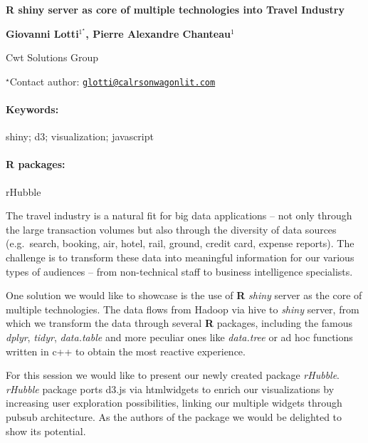 \documentclass[11pt, a4paper]{article}
\renewcommand{\title}[1]{\begin{center}{\bf \LARGE #1}\end{center}}
\newcommand{\keywords}{\paragraph{Keywords:}}
\newcommand{\packages}{\paragraph{R packages:}}
\begin{document}
\pagestyle{empty}

\title{R shiny server as core of multiple technologies into Travel Industry}

\begin{center}
  {\bf {} Giovanni Lotti$^{1^\star}$,  Pierre Alexandre Chanteau$^{1}$}
\end{center}

\vskip 0.3cm

\begin{affiliations}
\begin{enumerate}
\begin{minipage}{0.915\textwidth}
\centering
\item Cwt Solutions Group \\[-2pt]
\end{minipage}
\end{enumerate}
$^\star$Contact author: \href{mailto:glotti@calrsonwagonlit.com}{\nolinkurl{glotti@calrsonwagonlit.com}}\\
\end{affiliations}

\vskip 0.5cm

\begin{minipage}{0.915\textwidth}
\keywords shiny; d3; visualization; javascript
\packages {} rHubble
\end{minipage}

\vskip 0.8cm

The travel industry is a natural fit for big data applications -- not
only through the large transaction volumes but also through the
diversity of data sources (e.g.~search, booking, air, hotel, rail,
ground, credit card, expense reports). The challenge is to transform
these data into meaningful information for our various types of
audiences -- from non-technical staff to business intelligence
specialists.

One solution we would like to showcase is the use of \textbf{R}
\emph{shiny} server as the core of multiple technologies. The data flows
from Hadoop via hive to \emph{shiny} server, from which we transform the
data through several \textbf{R} packages, including the famous
\emph{dplyr}, \emph{tidyr}, \emph{data.table} and more peculiar ones
like \emph{data.tree} or ad hoc functions written in c++ to obtain the
most reactive experience.

For this session we would like to present our newly created package
\emph{rHubble}. \emph{rHubble} package ports d3.js via htmlwidgets to
enrich our visualizations by increasing user exploration possibilities,
linking our multiple widgets through pubsub architecture. As the authors
of the package we would be delighted to show its potential.
\end{document}
